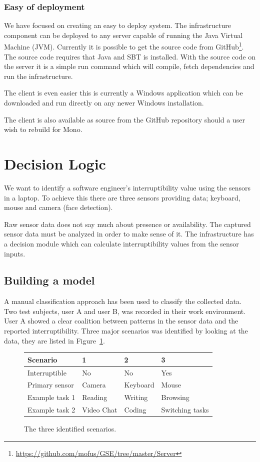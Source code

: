 \documentclass{sigchi}
\begin{document}
\subsubsection{Easy of deployment}
We have focused on creating an easy to deploy system.
The infrastructure component can be deployed to any server capable of running the Java Virtual Machine (JVM).
Currently it is possible to get the source code from GitHub\footnote{\url{https://github.com/mofus/GSE/tree/master/Server}}.
The source code requires that Java and SBT is installed.
With the source code on the server it is a simple run command which will compile, fetch dependencies and run the infrastructure.

The client is even easier this is currently a Windows application which can be downloaded and run directly on any newer Windows installation.

The client is also available as source from the GitHub repository should a user wish to rebuild for Mono.

\section{Decision Logic}
\label{sec:decision_logic}
We want to identify a software engineer’s interruptibility value using the sensors in a laptop.
To achieve this there are three sensors providing data; keyboard, mouse and camera (face detection).

Raw sensor data does not say much about presence or availability.
The captured sensor data must be analyzed in order to make sense of it.
The infrastructure has a decision module which can calculate interruptibility values from the sensor inputs.

\subsection{Building a model}
A manual classification approach has been used to classify the collected data.
Two test subjects, user A and user B, was recorded in their work environment.
User A showed a clear coalition between patterns in the sensor data and the reported interruptibility.
Three major scenarios was identified by looking at the data, they are listed in Figure~\ref{fig:scenarios}.

\begin{figure}[H]
  \centering
      \begin{tabular}{@{}llll@{}}
      \toprule
      \textbf{Scenario} & \textbf{1} & \textbf{2} & \textbf{3}      \\ \midrule
      Interruptible     & No         & No         & Yes             \\
      Primary sensor    & Camera     & Keyboard   & Mouse           \\
      Example task 1    & Reading    & Writing    & Browsing        \\
      Example task 2    & Video Chat & Coding     & Switching tasks \\ \bottomrule
      \end{tabular}
  \caption{The three identified scenarios.}
  \label{fig:scenarios}
\end{figure}
\end{document}
